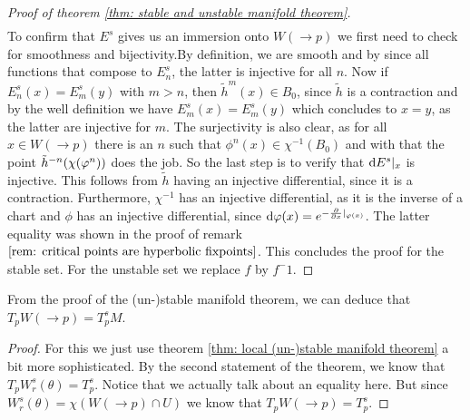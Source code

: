 \begin{proof}[Proof of theorem \ref{thm: stable and unstable manifold theorem}]
\begin{align*}
	\end{align*} To confirm that $E^s$ gives us an immersion onto $W(\to p)$ we first need to check for smoothness and bijectivity.By definition, we are smooth and by since all functions that compose to $E^s_n$, the latter is injective for all $n$. Now if $E^s_n(x)=E^s_m(y)$ with $m>n$, then $\tilde{h}^m(x)\in B_0$, since $\tilde{h}$ is a contraction and by the well definition we have $E^s_m(x)=E^s_m(y)$ which concludes to $x=y$, as the latter are injective for $m$. The surjectivity is also clear, as for all $x\in W(\to p)$ there is an $n$ such that $\phi^n(x)\in \chi^{-1}(B_0)$ and with that the point $\Tilde{h}^{-n}(\chi(\phi^n))$ does the job. So the last step is to verify that $\diff E^s|_x$ is injective. This follows from $\tilde{h}$ having an injective differential, since it is a contraction. Furthermore, $\chi^{-1}$ has an injective differential, as it is the inverse of a chart and $\phi$ has an injective differential, since $\diff \phi (x)=e^{-\frac{\partial}{\partial x}|_{\phi(x)}}$. The latter equality was shown in the proof of remark $\ref{rem: critical points are hyperbolic fixpoints}$. This concludes the proof for the stable set. For the unstable set we replace $f$ by $f^-1$. 
\end{proof}
\begin{corollary}
	From the proof of the (un-)stable manifold theorem, we can deduce that $T_pW(\to p)=T^s_pM$.
\end{corollary}
\begin{proof}
	For this we just use theorem \ref{thm: local (un-)stable manifold theorem} a bit more sophisticated. By the second statement of the theorem, we know that $T_pW^s_r(\theta)=T^s_p$. Notice that we actually talk about an equality here. But since $W^s_r(\theta)=\chi(W(\to p) \cap U)$ we know that $T_pW(\to p)=T^s_p$. 
\end{proof}

